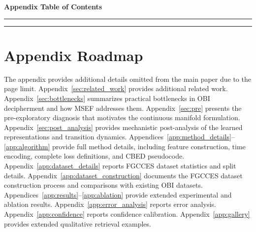 \documentclass{article}
\begin{document}
\newpage

\appendix



\vspace{1em}
\begin{center}
    \Large\bfseries Appendix Table of Contents
\end{center}
\vspace{1em}
\hrule
\vspace{1.5em}

\startcontents[sections]

\vspace{1.5em}
\hrule
\vspace{2em}




\section{Appendix Roadmap}
\label{app:roadmap}

The appendix provides additional details omitted from the main paper due to the page limit.
Appendix~\ref{sec:related_work} provides additional related work.
Appendix~\ref{sec:bottlenecks} summarizes practical bottlenecks in OBI decipherment and how MSEF addresses them.
Appendix~\ref{sec:pre} presents the pre-exploratory diagnosis that motivates the continuous manifold formulation.
Appendix~\ref{sec:post_analysis} provides mechanistic post-analysis of the learned representations and transition dynamics.
Appendices~\ref{app:method_details}--\ref{app:algorithm} provide full method details, including feature construction, time encoding, complete loss definitions, and CBED pseudocode.
Appendix~\ref{app:dataset_details} reports FGCCES dataset statistics and split details.
Appendix~\ref{app:dataset_construction} documents the FGCCES dataset construction process and comparisons with existing OBI datasets.
Appendices~\ref{app:results}--\ref{app:ablation} provide extended experimental and ablation results.
Appendix~\ref{app:error_analysis} reports error analysis.
Appendix~\ref{app:confidence} reports confidence calibration.
Appendix~\ref{app:gallery} provides extended qualitative retrieval examples.
\end{document}
